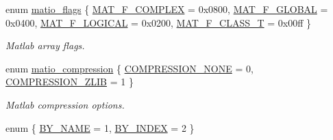 \begin{DoxyCompactItemize}
enum \hyperlink{group__MAT_gab9d6ef9e3ddca78a317b173f01d53fbb}{matio\-\_\-flags} \{ \hyperlink{group__MAT_ggab9d6ef9e3ddca78a317b173f01d53fbbacd7b091a11184aad7fc6078c04470780}{M\-A\-T\-\_\-\-F\-\_\-\-C\-O\-M\-P\-L\-E\-X} = 0x0800, 
\hyperlink{group__MAT_ggab9d6ef9e3ddca78a317b173f01d53fbba49084e0c796aa7963e53f7539525d40d}{M\-A\-T\-\_\-\-F\-\_\-\-G\-L\-O\-B\-A\-L} = 0x0400, 
\hyperlink{group__MAT_ggab9d6ef9e3ddca78a317b173f01d53fbba57eb5c6e200bcbc0f1b7982f29a169c2}{M\-A\-T\-\_\-\-F\-\_\-\-L\-O\-G\-I\-C\-A\-L} = 0x0200, 
\hyperlink{group__MAT_ggab9d6ef9e3ddca78a317b173f01d53fbba3a88beaec448e0485ffe21b18a540c1d}{M\-A\-T\-\_\-\-F\-\_\-\-C\-L\-A\-S\-S\-\_\-\-T} = 0x00ff
 \}
\begin{DoxyCompactList}\small\item\em Matlab array flags. \end{DoxyCompactList}\item 
enum \hyperlink{group__MAT_ga768c318af97bd2567758ecb001ceb7f4}{matio\-\_\-compression} \{ \hyperlink{group__MAT_gga768c318af97bd2567758ecb001ceb7f4ac549b871996d1ef05d40056bf5bb52e5}{C\-O\-M\-P\-R\-E\-S\-S\-I\-O\-N\-\_\-\-N\-O\-N\-E} = 0, 
\hyperlink{group__MAT_gga768c318af97bd2567758ecb001ceb7f4a1f453c9a2c01b52294b37a1226837f86}{C\-O\-M\-P\-R\-E\-S\-S\-I\-O\-N\-\_\-\-Z\-L\-I\-B} = 1
 \}
\begin{DoxyCompactList}\small\item\em Matlab compression options. \end{DoxyCompactList}\item 
enum \{ \hyperlink{group__MAT_gga06fc87d81c62e9abb8790b6e5713c55ba8938378c70879fe916177141cce0417e}{B\-Y\-\_\-\-N\-A\-M\-E} = 1, 
\hyperlink{group__MAT_gga06fc87d81c62e9abb8790b6e5713c55ba5f4d5606de1ec27f80f4a50186909005}{B\-Y\-\_\-\-I\-N\-D\-E\-X} = 2
 \}
\end{DoxyCompactItemize}
